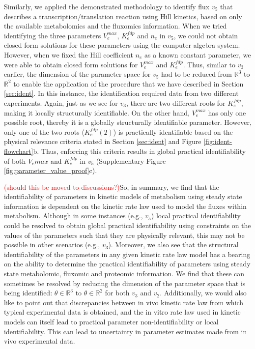 \documentclass[10pt]{article}
\begin{document}
	Similarly, we applied the demonstrated methodology to identify flux $v_5$ that describes a transcription/translation reaction using Hill kinetics, based on only the available metabolomics and the fluxomics information. When we tried identifying the three parameters $V_e^{max}$, $K_e^{fdp}$ and $n_e$ in $v_5$, we could not obtain closed form solutions for these parameters using the computer algebra system. However, when we fixed the Hill coefficient $n_e$ as a known constant parameter, we were able to obtain closed form solutions for $V_e^{max}$ and $K_e^{fdp}$. Thus, similar to $v_3$ earlier, the dimension of the parameter space for $v_5$ had to be reduced from $\mathbb{R}^3$ to $\mathbb{R}^2$ to enable the application of the procedure that we have described in Section \ref{sec:ident}. In this instance, the identification required data from two different experiments. Again, just as we see for $v_3$, there are two different roots for $K_e^{fdp}$, making it locally structurally identifiable. On the other hand, $V_e^{max}$ has only one possible root, thereby it is a globally structurally identifiable parameter. However, only one of the two roots ($K_e^{fdp}(2)$) is practically identifiable based on the physical relevance criteria stated in Section \ref{sec:ident} and Figure \ref{fig:ident-flowchart}b. Thus, enforcing this criteria results in global practical identifiability of both $V_e{max}$ and $K_e^{fdp}$ in $v_5$ (Supplementary Figure \ref{fig:parameter_value_proof}c).
	
	\textcolor{red}{(should this be moved to discussions?)}So, in summary, we find that the identifiability of parameters in kinetic models of metabolism using steady state information is dependent on the kinetic rate law used to model the fluxes within metabolism. Although in some instances (e.g., $v_5$) local practical identifiability could be resolved to obtain global practical identifiability using constraints on the values of the parameters such that they are physically relevant, this may not be possible in other scenarios (e.g., $v_3$). Moreover, we also see that the structural identifiability of the parameters in any given kinetic rate law model has a bearing on the ability to determine the practical identifiability of parameters using steady state metabolomic, fluxomic and proteomic information. We find that these can sometimes be resolved by reducing the dimension of the parameter space that is being identified: $\theta \in \mathbb{R}^3$ to $\theta \in \mathbb{R}^2$ for both $v_3$ and $v_2$. Additionally, we would also like to point out that discrepancies between in vivo kinetic rate law from which typical experimental data is obtained, and the in vitro rate law used in kinetic models can itself lead to practical parameter non-identifiability or local identifiability. This can lead to uncertainty in parameter estimates made from in vivo experimental data.
		
\end{document}
